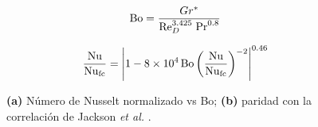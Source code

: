 \begin{equation}
\text{Bo}= \frac{Gr^*}{\text{Re}_D^{3\text{.}425} \hspace*{1mm} \text{Pr}^{0\text{.}8}}
\label{eq:jackson_bo}
\end{equation}

\begin{equation}
\frac{\text{Nu}}{\text{Nu}_{\text{fc}}} =
\left\vert 1 - 8 \times 10^4 \hspace*{0.5mm} \text{Bo}
\left( \frac{\text{Nu}}{\text{Nu}_{\text{fc}}} \right)^{-2} \right\vert^{0\text{.}46}
\label{eq:jackson_corr}
\end{equation}

\begin{figure}[H]
  \centering
  \caption{\textbf{(a)} Número de Nusselt normalizado vs Bo; \textbf{(b)} paridad con la correlación de Jackson \textit{et al.} \cite{jackson1989studies}.}
  \label{fig:nusselt}
\end{figure}


